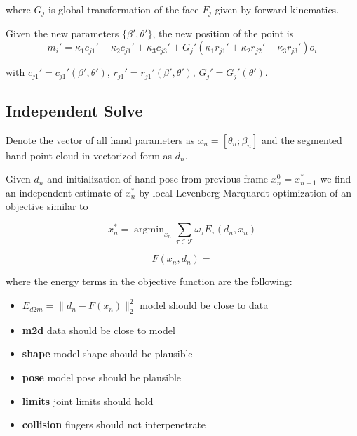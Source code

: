 \documentclass[10pt,twocolumn,letterpaper]{article}
\begin{document}
where $G_j$ is global transformation of the face $F_j$ given by forward kinematics.

Given the new parameters $\{ \beta', \theta' \}$, the new position of the point is
\begin{equation}
m_i' = \kappa_1 c_{j1}' + \kappa_2 c_{j1}' + \kappa_3 c_{j3}' + G_j' (\kappa_1 r_{j1}' + \kappa_2 r_{j2}' + \kappa_3 r_{j3}') o_i
\end{equation}

with $c_{j1}' = c_{j1}'(\beta', \theta')$,  $r_{j1}' = r_{j1}'(\beta', \theta')$, $G_j' =G_j'(\theta')$.

\subsection {Independent Solve} \label{sec:independent-solve}

Denote the vector of all hand parameters as $x_n = [\theta_n; \beta_n]$ and the segmented hand point cloud in vectorized form as $d_n$. 

Given $d_n$ and initialization of hand pose from previous frame $x_n^0 = x_{n - 1}^*$ we find an independent estimate of $x_n^*$ by local Levenberg-Marquardt optimization of an objective similar to \cite{tkach2016sphere}

\begin{equation}
x_n^* = \operatorname{argmin}_{x_n} \sum_{\tau \in \mathcal{T}} \omega_{\tau} E_{\tau} (d_n, x_n)
\end{equation}

\begin{equation}
F(x_n, d_n) = 
\end{equation}

where the energy terms in the objective function are the following:

\begin{itemize}
\vspace{-1em}
\item $E_{d2m} = \| d_n - F(x_n) \|_2^2$ model should be close to data
\vspace{-1em}
\item \textbf{m2d} data should be close to model
\vspace{-1em}
\item \textbf{shape} model shape should be plausible
\vspace{-1em}
\item \textbf{pose} model pose should be plausible
\vspace{-1em}
\item \textbf{limits} joint limits should hold
\vspace{-1em}
\item \textbf{collision} fingers should not interpenetrate
\end{itemize}
\end{document}
